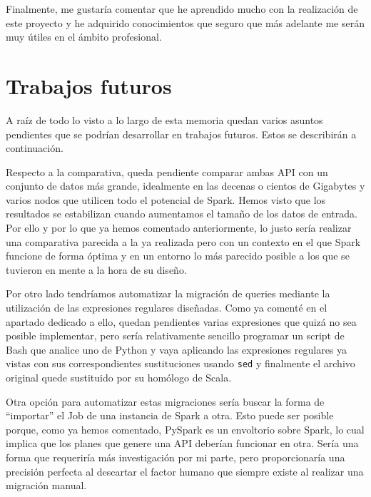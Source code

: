 \documentclass[12pt,twoside,titlepage]{report}
\newcommand{\quotes}[1]{``#1''}
\begin{document}
Finalmente, me gustaría comentar que he aprendido mucho con la realización de este proyecto y he adquirido conocimientos que seguro que más adelante me serán muy útiles en el ámbito profesional.

\section{Trabajos futuros}

A raíz de todo lo visto a lo largo de esta memoria quedan varios asuntos pendientes que se podrían desarrollar en trabajos futuros. Estos se describirán a continuación.

Respecto a la comparativa, queda pendiente comparar ambas API con un conjunto de datos más grande, idealmente en las decenas o cientos de Gigabytes y varios nodos que utilicen todo el potencial de Spark. Hemos visto que los resultados se estabilizan cuando aumentamos el tamaño de los datos de entrada. Por ello y por lo que ya hemos comentado anteriormente, lo justo sería realizar una comparativa parecida a la ya realizada pero con un contexto en el que Spark funcione de forma óptima y en un entorno lo más parecido posible a los que se tuvieron en mente a la hora de su diseño.

Por otro lado tendríamos automatizar la migración de queries mediante la utilización de las expresiones regulares diseñadas. Como ya comenté en el apartado dedicado a ello, quedan pendientes varias expresiones que quizá no sea posible implementar, pero sería relativamente sencillo programar un script de Bash que analice uno de Python y vaya aplicando las expresiones regulares ya vistas con sus correspondientes sustituciones usando \texttt{sed} y finalmente el archivo original quede sustituido por su homólogo de Scala.



Otra opción para automatizar estas migraciones sería buscar la forma de \quotes{importar} el Job de una instancia de Spark a otra. Esto puede ser posible porque, como ya hemos comentado, PySpark es un envoltorio sobre Spark, lo cual implica que los planes que genere una API deberían funcionar en otra. Sería una forma que requeriría más investigación por mi parte, pero proporcionaría una precisión perfecta al descartar el factor humano que siempre existe al realizar una migración manual.
\end{document}
